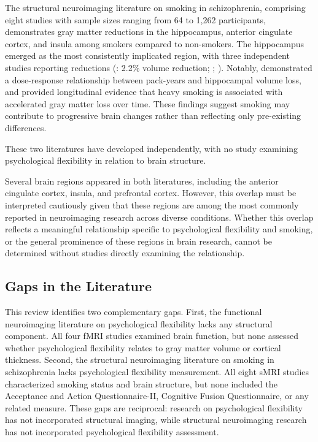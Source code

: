 \documentclass[12pt]{article}
\begin{document}
The structural neuroimaging literature on smoking in schizophrenia, comprising eight studies with sample sizes ranging from 64 to 1,262 participants, demonstrates gray matter reductions in the hippocampus, anterior cingulate cortex, and insula among smokers compared to non-smokers. The hippocampus emerged as the most consistently implicated region, with three independent studies reporting reductions (\citealt{schneider2014}: 2.2\% volume reduction; \citealt{qiu2024}; \citealt{musket2026}). Notably, \citet{musket2026} demonstrated a dose-response relationship between pack-years and hippocampal volume loss, and \citet{vanharen2010} provided longitudinal evidence that heavy smoking is associated with accelerated gray matter loss over time. These findings suggest smoking may contribute to progressive brain changes rather than reflecting only pre-existing differences.

These two literatures have developed independently, with no study examining psychological flexibility in relation to brain structure.

Several brain regions appeared in both literatures, including the anterior cingulate cortex, insula, and prefrontal cortex. However, this overlap must be interpreted cautiously given that these regions are among the most commonly reported in neuroimaging research across diverse conditions. Whether this overlap reflects a meaningful relationship specific to psychological flexibility and smoking, or the general prominence of these regions in brain research, cannot be determined without studies directly examining the relationship.

\subsection{Gaps in the Literature}

This review identifies two complementary gaps. First, the functional neuroimaging literature on psychological flexibility lacks any structural component. All four fMRI studies examined brain function, but none assessed whether psychological flexibility relates to gray matter volume or cortical thickness. Second, the structural neuroimaging literature on smoking in schizophrenia lacks psychological flexibility measurement. All eight sMRI studies characterized smoking status and brain structure, but none included the Acceptance and Action Questionnaire-II, Cognitive Fusion Questionnaire, or any related measure. These gaps are reciprocal: research on psychological flexibility has not incorporated structural imaging, while structural neuroimaging research has not incorporated psychological flexibility assessment.
\end{document}
